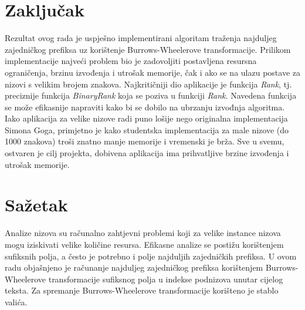 \documentclass[times, utf8, seminar, numeric]{fer}
\begin{document}
\chapter{Zaključak}
Rezultat ovog rada je uspješno implementirani algoritam traženja najduljeg zajedničkog prefiksa uz korištenje Burrows-Wheelerove transformacije. Prilikom implementacije najveći problem bio je zadovoljiti postavljena resursna ograničenja, brzinu izvođenja i utrošak memorije, čak i ako se na ulazu postave za nizovi s velikim brojem znakova. Najkritičniji dio aplikacije je funkcija \textit{Rank}, tj. preciznije funkcija \textit{BinaryRank} koja se poziva u funkciji \textit{Rank}. Navedena funkcija se može efikasnije napraviti kako bi se dobilo na ubrzanju izvođnja algoritma. Iako aplikacija za velike nizove radi puno lošije nego originalna implementacija Simona Goga, primjetno je kako studentska implementacija za male nizove (do 1000 znakova) troši znatno manje memorije i vremenski je brža. Sve u svemu, ostvaren je cilj projekta, dobivena aplikacija ima prihvatljive brzine izvođenja i utrošak memorije. 




\chapter{Sažetak}
Analize nizova su računalno zahtjevni problemi koji za velike instance nizova mogu iziskivati velike količine resursa. Efikasne analize se postižu korištenjem sufiksnih polja, a često je potrebno i polje najduljih zajedničkih prefiksa. U ovom radu objašnjeno je računanje najduljeg zajedničkog prefiksa korištenjem Burrows-Wheelerove transformacije sufiksnog polja u indekse podnizova unutar cijelog teksta. Za spremanje Burrows-Wheelerove transformacije korišteno je stablo valića.
\end{document}
